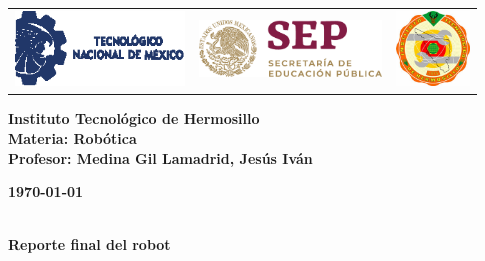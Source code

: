 \begin{titlepage}
	\centering
	\begin{tabular}{@{}p{} p{} p{}@{}}
		\includegraphics[height=2cm]{tecnm} & 
		\centering \includegraphics[height=1.5cm]{SEP} & 
		\raggedleft \includegraphics[height=2cm]{ith.jpg} \\
	\end{tabular}
	
	\vspace{2em}
	
	\noindent
	\begin{minipage}[t]{0.6\textwidth}
		\raggedright
		\small \textbf{%
			Instituto Tecnológico de Hermosillo\\
			Materia: Robótica\\
			Profesor: Medina Gil Lamadrid, Jesús Iván%
		}
	\end{minipage}%
	\hfill
	\begin{minipage}[t]{0.3\textwidth}
		\raggedleft
		\small \textbf{\today}
	\end{minipage}
	
	\vspace{2em}
	
	{\large \textbf{}}\\
	{\Huge \textbf{Reporte final del robot}}
		
	\vspace{1em}
	

\end{titlepage}
